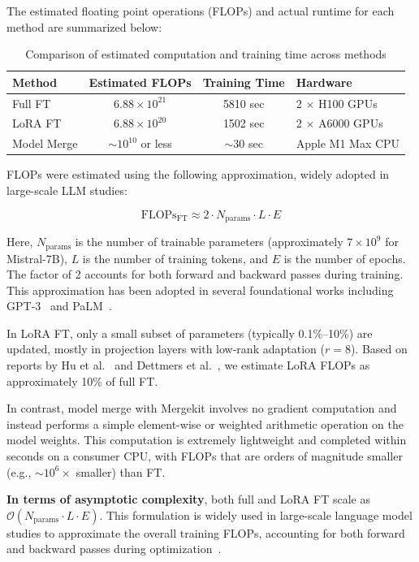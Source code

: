 \documentclass[conference,compsoc]{IEEEtran}
\begin{document}
The estimated floating point operations (FLOPs) and actual runtime for each method are summarized below:

\begin{table}[ht]
    \centering
    \caption{Comparison of estimated computation and training time across methods}
    \label{tab:flops_compare}
    \begin{tabularx}{0.9\linewidth}{l|c|c|X}
        \hline \hline
        \textbf{Method} & \textbf{Estimated FLOPs} & \textbf{Training Time} & \textbf{Hardware} \\
        \hline \hline
        Full FT & $6.88 \times 10^{21}$ & 5810 sec & 2 $\times$ H100 GPUs \\
        LoRA FT & $6.88 \times 10^{20}$ & 1502 sec & 2 $\times$ A6000 GPUs \\
        Model Merge & $\sim 10^{10}$ or less & $\sim$30 sec & Apple M1 Max CPU \\
        \hline \hline
    \end{tabularx}
\end{table}

FLOPs were estimated using the following approximation, widely adopted in large-scale LLM studies:

\[
\text{FLOPs}_{\text{FT}} \approx 2 \cdot N_{\text{params}} \cdot L \cdot E
\]

Here, $N_{\text{params}}$ is the number of trainable parameters (approximately $7 \times 10^9$ for Mistral-7B), $L$ is the number of training tokens, and $E$ is the number of epochs. The factor of 2 accounts for both forward and backward passes during training. This approximation has been adopted in several foundational works including GPT-3~\cite{kaplan2020scaling} and PaLM~\cite{chowdhery2022palm}.

In LoRA FT, only a small subset of parameters (typically 0.1\%–10\%) are updated, mostly in projection layers with low-rank adaptation ($r = 8$). Based on reports by Hu et al.~\cite{hu2021lora} and Dettmers et al.~\cite{dettmers2023qlora}, we estimate LoRA FLOPs as approximately 10\% of full FT.

In contrast, model merge with Mergekit involves no gradient computation and instead performs a simple element-wise or weighted arithmetic operation on the model weights. This computation is extremely lightweight and completed within seconds on a consumer CPU, with FLOPs that are orders of magnitude smaller (e.g., $\sim 10^6 \times$ smaller) than FT.

\textbf{In terms of asymptotic complexity}, both full and LoRA FT scale as $\mathcal{O}(N_{\text{params}} \cdot L \cdot E)$. 
This formulation is widely used in large-scale language model studies to approximate the overall training FLOPs, accounting for both forward and backward passes during optimization~\cite{kaplan2020scaling,chowdhery2022palm}.
\end{document}
